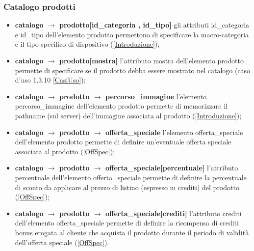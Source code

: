 \documentclass[a4paper, 14pt]{article}
\begin{document}
\begin{flushleft}
			\subsubsection{Catalogo prodotti} 
				\begin{itemize}
					\item \textbf{catalogo $\rightarrow$ prodotto[id\_categoria , id\_tipo] } gli attributi id\_categoria e id\_tipo dell'elemento prodotto permettono di specificare la macro-categoria e il tipo specifico di dispositivo (\ref{Introduzione});
					\item \textbf{catalogo $\rightarrow$ prodotto[mostra] } l'attributo mostra dell'elemento prodotto permette di specificare se il prodotto debba essere mostrato nel catalogo (caso d'uso 1.3.10 \ref{CasiUso});
					\item \textbf{catalogo $\rightarrow$ prodotto $\rightarrow$ percorso\_immagine } l'elemento percorso\_immagine dell'elemento prodotto permette di memorizzare il pathname (sul server) dell'immagine associata al prodotto
					(\ref{Introduzione});
					\item \textbf{catalogo $\rightarrow$ prodotto $\rightarrow$ offerta\_speciale } l'elemento offerta\_speciale dell'elemento prodotto permette di definire un'eventuale offerta speciale associata al prodotto
					(\ref{OffSpec});
					\item \textbf{catalogo $\rightarrow$ prodotto $\rightarrow$ offerta\_speciale[percentuale] } l'attributo percentuale dell'elemento offerta\_speciale permette di definire la percentuale di sconto da applicare al prezzo di listino (espresso in crediti) del prodotto (\ref{OffSpec});
					\item \textbf{catalogo $\rightarrow$ prodotto $\rightarrow$ offerta\_speciale[crediti] } l'attributo crediti dell'elemento offerta\_speciale permette di definire la ricompensa di crediti bonus erogata al cliente che acquista il prodotto durante il periodo di validità dell'offerta speciale (\ref{OffSpec}).
				\end{itemize}
			\smallskip
			

\end{flushleft}
\end{document}
